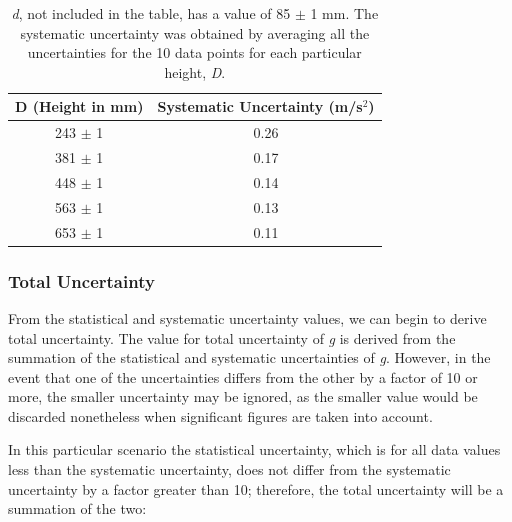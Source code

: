 \documentclass[titlepage]{article}
\begin{document}
\begin{table}[!htbp]
\renewcommand{\arraystretch}{1.3}
\centering
\begin{tabular}{c|c}
    \hline
    \hline
    D (Height in mm) & Systematic Uncertainty (m/s$^2$)\\
    \hline
    \hline

    243 $\pm$ 1    &  0.26 \\
    \hline

    381 $\pm$ 1    &  0.17 \\
    \hline

    448 $\pm$ 1   &  0.14\\
    \hline

    563 $\pm$ 1   &  0.13\\
    \hline

    653 $\pm$ 1  &  0.11\\
    \hline
\end{tabular}
\caption{\textit{d}, not included in the table, has a value of 85 $\pm$ 1 mm. The systematic uncertainty was obtained by averaging all the uncertainties for the 10 data points for each particular height, \textit{D}.}
\end{table}

\subsubsection{Total Uncertainty}
From the statistical and systematic uncertainty values, we can begin to derive total uncertainty. The value for total uncertainty of \textit{g} is derived from the summation of the statistical and systematic uncertainties of \textit{g}. However, in the event that one of the uncertainties differs from the other by a factor of 10 or more, the smaller uncertainty may be ignored, as the smaller value would be discarded nonetheless when significant figures are taken into account. 

In this particular scenario the statistical uncertainty, which is for all data values less than the systematic uncertainty, does not differ from the systematic uncertainty by a factor greater than 10; therefore, the total uncertainty will be a summation of the two:
\end{document}
